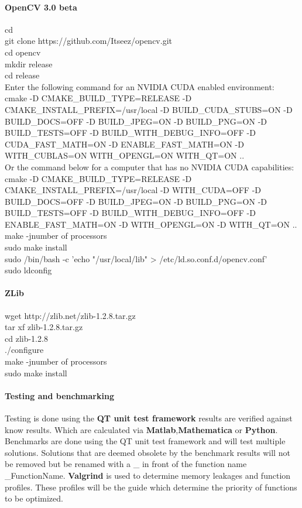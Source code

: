 \paragraph{OpenCV 3.0 beta}
\begin{sBox}
	cd \~\\   
	git clone https://github.com/Itseez/opencv.git\\
	cd opencv\\
	mkdir release\\
	cd release\\
	Enter the following command for an NVIDIA CUDA enabled environment:\\
	cmake -D CMAKE\_BUILD\_TYPE=RELEASE -D CMAKE\_INSTALL\_PREFIX=/usr/local -D BUILD\_CUDA\_STUBS=ON -D BUILD\_DOCS=OFF -D BUILD\_JPEG=ON -D BUILD\_PNG=ON -D BUILD\_TESTS=OFF -D BUILD\_WITH\_DEBUG\_INFO=OFF -D CUDA\_FAST\_MATH=ON -D ENABLE\_FAST\_MATH=ON -D WITH\_CUBLAS=ON WITH\_OPENGL=ON WITH\_QT=ON ..\\
	Or the command below for a computer that has no NVIDIA CUDA capabilities:\\  
	cmake -D CMAKE\_BUILD\_TYPE=RELEASE -D CMAKE\_INSTALL\_PREFIX=/usr/local -D WITH\_CUDA=OFF -D BUILD\_DOCS=OFF -D BUILD\_JPEG=ON -D BUILD\_PNG=ON -D BUILD\_TESTS=OFF -D BUILD\_WITH\_DEBUG\_INFO=OFF -D ENABLE\_FAST\_MATH=ON -D WITH\_OPENGL=ON -D WITH\_QT=ON ..\\
	make -jnumber of processors\\
	sudo make install\\
	sudo /bin/bash -c 'echo "/usr/local/lib" > /etc/ld.so.conf.d/opencv.conf'\\
	sudo ldconfig\\
\end{sBox}  
  
\paragraph{ZLib}
\begin{sBox}
	wget http://zlib.net/zlib-1.2.8.tar.gz\\
	tar xf zlib-1.2.8.tar.gz\\
	cd zlib-1.2.8\\
	./configure\\
	make -jnumber of processors\\
	sudo make install\\
\end{sBox}

\paragraph{Testing and benchmarking}
Testing is done using the \textbf{QT unit test framework} results are verified against know results. Which are calculated via \textbf{Matlab},\textbf{Mathematica} or \textbf{Python}. Benchmarks are done using the QT unit test framework and will test multiple solutions. Solutions that are deemed obsolete by the benchmark results will not be removed but be renamed with a \_ in front of the function name \_FunctionName. \textbf{Valgrind} is used to determine memory leakages and function profiles. These profiles will be the guide which determine the priority of functions to be optimized.

